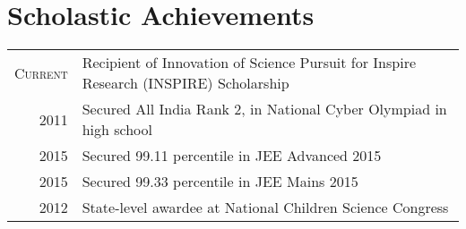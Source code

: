 \documentclass[a4paper,10pt]{extarticle} %
\begin{document}

 \section{Scholastic Achievements}

\begin{tabular}{r|p{18cm}}
\textsc{Current} &{Recipient of Innovation of Science Pursuit for Inspire Research (INSPIRE) Scholarship}
\vspace{2mm} \\
\textsc{2011} &{Secured All India Rank 2, in National Cyber Olympiad in high school}
\vspace{2mm} \\
\textsc{2015} &{Secured 99.11 percentile in JEE Advanced 2015}
\vspace{2mm} \\
\textsc{2015} &{Secured 99.33 percentile in JEE Mains 2015}
\vspace{2mm} \\ 
\textsc{2012} &{State-level awardee at National Children Science Congress} \vspace{2mm} \\
\end{tabular}


\end{document}

